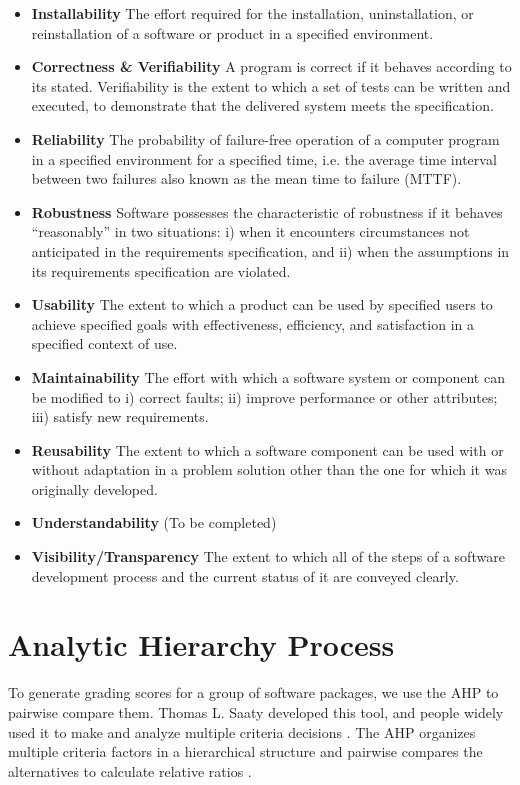 \begin{itemize}
\label{def_installability}
\item \textbf{Installability} The effort required for the installation, uninstallation, or reinstallation of a software or product in a specified environment.
\label{def_correctness_verifiability}
\item \textbf{Correctness \& Verifiability} A program is correct if it behaves according to its stated. Verifiability is the extent to which a set of tests can be written and executed, to demonstrate that the delivered system meets the specification.
\label{def_reliability}
\item \textbf{Reliability} The probability of failure-free operation of a computer program in a specified environment for a specified time, i.e. the average time interval between two failures also known as the mean time to failure (MTTF).
\label{def_robustness}
\item \textbf{Robustness} Software possesses the characteristic of robustness if it behaves ``reasonably'' in two situations: i) when it encounters circumstances not anticipated in the requirements specification, and ii) when the assumptions in its requirements specification are violated.
\label{def_usability}
\item \textbf{Usability} The extent to which a product can be used by specified users to achieve specified goals with effectiveness, efficiency, and satisfaction in a specified context of use.
\label{def_maintainability}
\item \textbf{Maintainability} The effort with which a software system or component can be modified to i) correct faults; ii) improve performance or other attributes; iii) satisfy new requirements.
\label{def_reusability}
\item \textbf{Reusability} The extent to which a software component can be used with or without adaptation in a problem solution other than the one for which it was originally developed.
\label{def_understandability}
\item \textbf{Understandability} (To be completed)
\label{def_visibility_transparency}
\item \textbf{Visibility/Transparency} The extent to which all of the steps of a software development process and the current status of it are conveyed clearly.
\end{itemize}

\section{Analytic Hierarchy Process}
\label{sec_AHP}
To generate grading scores for a group of software packages, we use the AHP to pairwise compare them. Thomas L. Saaty developed this tool, and people widely used it to make and analyze multiple criteria decisions \cite{VaidyaEtAl2006}. The AHP organizes multiple criteria factors in a hierarchical structure and pairwise compares the alternatives to calculate relative ratios \cite{Saaty1990}.

